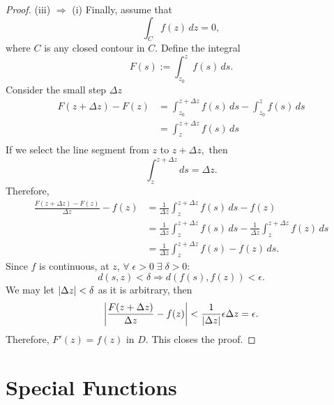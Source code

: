 \documentclass[12pt]{book}
\begin{document}
\begin{proof}
    \noindent (iii) $\Rightarrow$ (i)
    Finally, assume that 
    \[
        \int_{C} f(z)\,dz = 0,
    \]
    where $C$ is any closed contour in $C.$ Define the integral
    \[
        F(s) := \int_{z_0}^{z}f(s)\,ds.
    \]
    Consider the small step $\Delta z$
    \begin{align*}
        F(z + \Delta z) - F(z) 
            &= 
                \int_{z_0}^{z + \Delta z}f(s)\,ds - \int_{z_0}^{z}f(s)\,ds \\
            &= 
                \int_{z}^{z + \Delta z}f(s)\,ds \\
    \end{align*}
    If we select the line segment from $z$ to $z + \Delta z,$ then
    \[
        \int_{z}^{z + \Delta z} ds = \Delta z.
    \]
    Therefore,
    \begin{align*}
        \frac{F(z + \Delta z) - F(z)}{\Delta z} - f(z)
            &=
                \frac{1}{\Delta z}\int_{z}^{z + \Delta z} f(s)\,ds - f(z) \\
            &=
                \frac{1}{\Delta z}\int_{z}^{z + \Delta z} f(s)\,ds - \frac{1}{\Delta z}\int_{z}^{z + \Delta z} f(z)\,ds \\
            &=
                \frac{1}{\Delta z}\int_{z}^{z + \Delta z} f(s) - f(z)\,ds.
    \end{align*}
    Since $f$ is continuous, at $z$, $\forall\; \epsilon > 0 \;\exists\; \delta > 0:$
    \[
        d(s, z) < \delta \Rightarrow d(f(s), f(z)) < \epsilon.
    \] 
    We may let $\left\lvert \Delta z \right\rvert < \delta$ as it is arbitrary, then
    \[
        \left\lvert \frac{F(z + \Delta z)}{\Delta z} - f(z) \right\rvert < \frac{1}{\left\lvert \Delta z \right\rvert} \epsilon \Delta z = \epsilon.
    \]
    Therefore, $F'(z) = f(z)$ in $D.$ This closes the proof.
\end{proof}

\section{Special Functions}
\end{document}
